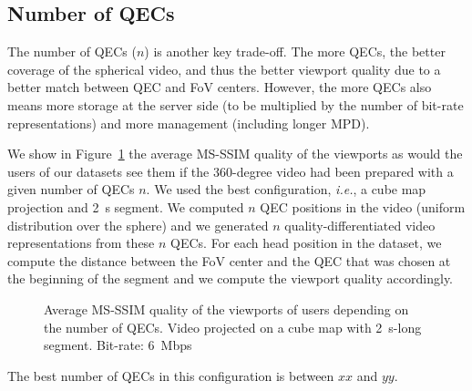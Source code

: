 
\subsection{Number of \acp{QEC}}

The number of QECs ($n$) is another key trade-off. The more QECs, the better coverage
of the spherical video, and thus the better viewport quality due to a better match 
between QEC and FoV centers. However, the more QECs also means more storage
at the server side (to be multiplied by the number of bit-rate representations) and
more management (including longer \ac{MPD}).

We show in Figure~\ref{fig:QEC} the average \acs{MS-SSIM} quality of the viewports as
would the users of our datasets see them if the 360-degree video had been prepared
with a given number of QECs $n$. We used the best configuration, \textit{i.e.}, a cube map projection
and \SI{2}{\second} segment. We computed $n$ QEC positions in the video (uniform distribution over the sphere) and we generated $n$ quality-differentiated video representations from these $n$ QECs. 
For each head position in the dataset, we compute the distance between the
FoV center and the QEC that was chosen at the beginning of the segment and we compute
the viewport quality accordingly.

\begin{figure}[htbp]
\centering

\caption{Average \acs{MS-SSIM} quality of the viewports of users depending 
on the number of QECs. Video projected on a cube map with \SI{2}{\second}-long segment. 
Bit-rate: \SI{6}{\mega bps}}
\label{fig:QEC}
\end{figure}

The best number of QECs in this configuration is between $xx$ and $yy$.